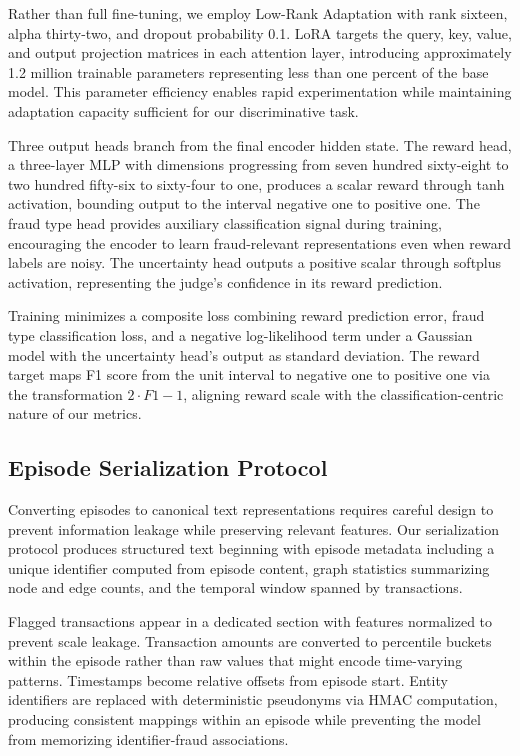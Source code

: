 \documentclass[11pt,a4paper]{article}
\begin{document}
Rather than full fine-tuning, we employ Low-Rank Adaptation with rank sixteen, alpha thirty-two, and dropout probability 0.1. LoRA targets the query, key, value, and output projection matrices in each attention layer, introducing approximately 1.2 million trainable parameters representing less than one percent of the base model. This parameter efficiency enables rapid experimentation while maintaining adaptation capacity sufficient for our discriminative task.

Three output heads branch from the final encoder hidden state. The reward head, a three-layer MLP with dimensions progressing from seven hundred sixty-eight to two hundred fifty-six to sixty-four to one, produces a scalar reward through tanh activation, bounding output to the interval negative one to positive one. The fraud type head provides auxiliary classification signal during training, encouraging the encoder to learn fraud-relevant representations even when reward labels are noisy. The uncertainty head outputs a positive scalar through softplus activation, representing the judge's confidence in its reward prediction.

Training minimizes a composite loss combining reward prediction error, fraud type classification loss, and a negative log-likelihood term under a Gaussian model with the uncertainty head's output as standard deviation. The reward target maps F1 score from the unit interval to negative one to positive one via the transformation $2 \cdot F1 - 1$, aligning reward scale with the classification-centric nature of our metrics.

\subsection{Episode Serialization Protocol}

Converting episodes to canonical text representations requires careful design to prevent information leakage while preserving relevant features. Our serialization protocol produces structured text beginning with episode metadata including a unique identifier computed from episode content, graph statistics summarizing node and edge counts, and the temporal window spanned by transactions.

Flagged transactions appear in a dedicated section with features normalized to prevent scale leakage. Transaction amounts are converted to percentile buckets within the episode rather than raw values that might encode time-varying patterns. Timestamps become relative offsets from episode start. Entity identifiers are replaced with deterministic pseudonyms via HMAC computation, producing consistent mappings within an episode while preventing the model from memorizing identifier-fraud associations.
\end{document}
